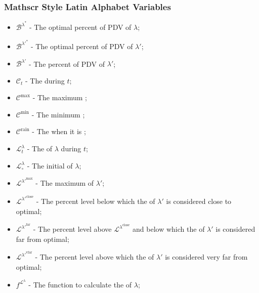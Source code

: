 \documentclass[class=article, crop=false]{standalone}
\begin{document}

\subsubsection{Mathscr Style Latin Alphabet Variables}

\begin{itemize}[topsep=0pt, itemsep=3pt,leftmargin=16pt]
    \item[] $\mathscr{B}^{\lambda^{*}}$ - The optimal percent of  PDV of $\lambda$;
    \item[] $\mathscr{B}^{\lambda'^{*}}$ - The optimal percent of  PDV of $\lambda'$;
    \item[] $\mathscr{B}^{\lambda'}$ - The percent of  PDV of $\lambda'$;
    \item[] $\mathscr{C}_{t}$ - The  during $t$;
    \item[] $\mathscr{C}^{\text{max}}$ - The maximum ;
    \item[] $\mathscr{C}^{\text{min}}$ - The minimum ;
    \item[] $\mathscr{C}^{\text{rain}}$ - The  when it is ;
    \item[] $\mathscr{L}_{t}^{\lambda}$ - The  of $\lambda$ during $t$;
    \item[] $\mathscr{L}_{\circ}^{\lambda}$ - The initial  of $\lambda$;
    \item[] $\mathscr{L}^{\lambda'^{\text{max}}}$ - The maximum  of $\lambda'$;
    \item[] $\mathscr{L}^{\lambda'^{\text{close}}}$ - The percent level below which the  of $\lambda'$ is considered close to optimal;
    \item[] $\mathscr{L}^{\lambda'^{\text{far}}}$ - The percent level above $\mathscr{L}^{\lambda^{\text{close}}}$ and below which the  of $\lambda'$ is considered far from optimal;
    \item[] $\mathscr{L}^{\lambda'^{\text{vfar}}}$ - The percent level above which the  of $\lambda'$ is considered very far from optimal;
    \item[] $f^{\mathscr{L}^{\lambda}}$ - The function to calculate the  of $\lambda$;

\end{itemize}
\end{document}
